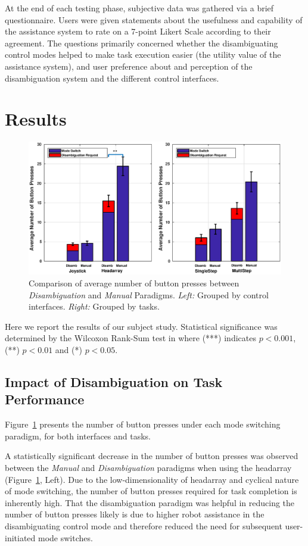 \documentclass[natbib, twocolumn]{svjour3}          %
\begin{document}
At the end of each testing phase, subjective data was gathered via a brief questionnaire. Users were given statements about the usefulness and capability of the assistance system to rate on a 7-point Likert Scale according to their agreement. The questions primarily concerned whether the disambiguating control modes helped to make task execution easier (the utility value of the assistance system), and user preference about and perception of the disambiguation system and the different control interfaces.  


\section{Results}\label{sec:results}

\begin{figure}[ht!]
	\centering
	\includegraphics[keepaspectratio, width = 0.91\hsize ,center]{Fig8.eps}
	\caption{Comparison of average number of button presses between \textit{Disambiguation} and \textit{Manual} Paradigms. \textit{Left:} Grouped by control interfaces. \textit{Right:} Grouped by tasks.}
	\label{fig:button_press}
\end{figure}
Here we report the results of our subject study. Statistical significance was determined by the Wilcoxon Rank-Sum test in where (***) indicates $p < 0.001$, (**) $p < 0.01$ and (*) $p < 0.05$. 

\subsection{Impact of Disambiguation on Task Performance}
Figure~\ref{fig:button_press} presents the number of button presses under each mode switching paradigm, for both interfaces and tasks. 

A statistically significant decrease in the number of button presses was observed between the \textit{Manual} and \textit{Disambiguation} paradigms when using the headarray (Figure~\ref{fig:button_press}, Left). Due to the low-dimensionality of headarray and cyclical nature of mode switching, the number of button presses required for task completion is inherently high. That the disambiguation paradigm was helpful in reducing the number of button presses likely is due to higher robot assistance in the disambiguating control mode and therefore reduced the need for subsequent user-initiated mode switches. 
\end{document}
